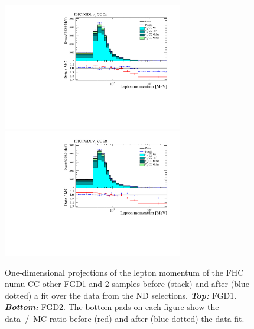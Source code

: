 \begin{figure}[ht]
  \center
  \includegraphics[keepaspectratio=true,width=0.7\textwidth,page=3]{images/BANFF/reactionCodeStacks_PrefitAndPostfit_mom.pdf}\\
  \includegraphics[keepaspectratio=true,width=0.7\textwidth,page=6]{images/BANFF/reactionCodeStacks_PrefitAndPostfit_mom.pdf}\\
  \begin{center}
    \caption[FHC $\nu_\mu$ CC other FGD1 and 2 samples before and
    after a fit over the data from the ND280
    selections]{One-dimensional projections of the lepton momentum of
      the \Gls{FHC} \Gls{numu} \Gls{CC} other \Gls{FGD}1 and 2 samples
      before (stack) and after (blue dotted) a fit over the data from
      the \Gls{ND} selections. \textbf{\textit{Top:}}
      \Gls{FGD}1. \textbf{\textit{Bottom:}} \Gls{FGD}2. The bottom
      pads on each figure show the data~/~\Gls{MC} ratio before (red)
      and after (blue dotted) the data fit.}
    \label{fig:numuCCother}
  \end{center}
\end{figure}


